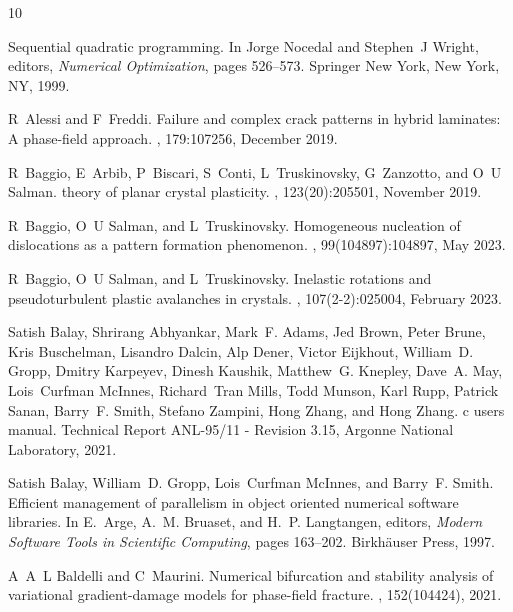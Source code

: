 \documentclass[10pt]{article}
\begin{document}
%
\begin{thebibliography}{10}

    Sequential quadratic programming.
    \newblock In Jorge Nocedal and Stephen~J Wright, editors, {\em Numerical Optimization}, pages 526--573. Springer New York, New York, NY, 1999.

    R~Alessi and F~Freddi.
    \newblock Failure and complex crack patterns in hybrid laminates: A phase-field approach.
    , 179:107256, December 2019.

    R~Baggio, E~Arbib, P~Biscari, S~Conti, L~Truskinovsky, G~Zanzotto, and O~U Salman.
     theory of planar crystal plasticity.
    , 123(20):205501, November 2019.

    R~Baggio, O~U Salman, and L~Truskinovsky.
    \newblock Homogeneous nucleation of dislocations as a pattern formation phenomenon.
    , 99(104897):104897, May 2023.

    R~Baggio, O~U Salman, and L~Truskinovsky.
    \newblock Inelastic rotations and pseudoturbulent plastic avalanches in crystals.
    , 107(2-2):025004, February 2023.

    Satish Balay, Shrirang Abhyankar, Mark~F. Adams, Jed Brown, Peter Brune, Kris Buschelman, Lisandro Dalcin, Alp Dener, Victor Eijkhout, William~D. Gropp, Dmitry Karpeyev, Dinesh Kaushik, Matthew~G. Knepley, Dave~A. May, Lois~Curfman McInnes, Richard~Tran Mills, Todd Munson, Karl Rupp, Patrick Sanan, Barry~F. Smith, Stefano Zampini, Hong Zhang, and Hong Zhang.
    c users manual.
    \newblock Technical Report ANL-95/11 - Revision 3.15, Argonne National Laboratory, 2021.

    Satish Balay, William~D. Gropp, Lois~Curfman McInnes, and Barry~F. Smith.
    \newblock Efficient management of parallelism in object oriented numerical software libraries.
    \newblock In E.~Arge, A.~M. Bruaset, and H.~P. Langtangen, editors, {\em Modern Software Tools in Scientific Computing}, pages 163--202. Birkh{\"{a}}user Press, 1997.

    A~A~L Baldelli and C~Maurini.
    \newblock Numerical bifurcation and stability analysis of variational gradient-damage models for phase-field fracture.
    , 152(104424), 2021.


\end{thebibliography}
\end{document}
